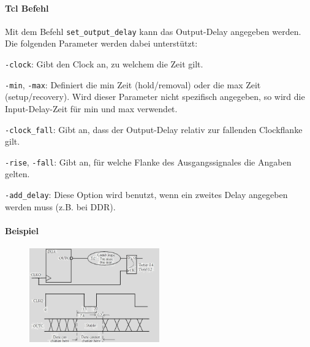 \paragraph{Tcl Befehl}
Mit dem Befehl \texttt{set\_output\_delay} kann das Output-Delay angegeben werden. Die folgenden Parameter werden dabei unterstützt:
\begin{compactitem}
    \item \texttt{-clock}: Gibt den Clock an, zu welchem die Zeit gilt.
    \item \texttt{-min}, \texttt{-max}: Definiert die min Zeit (hold/removal) oder die max Zeit (setup/recovery). Wird dieser Parameter nicht spezifisch angegeben, so wird die Input-Delay-Zeit für min und max verwendet.
    \item \texttt{-clock\_fall}: Gibt an, dass der Output-Delay relativ zur fallenden Clockflanke gilt.
    \item \texttt{-rise}, \texttt{-fall}: Gibt an, für welche Flanke des Ausgangssignales die Angaben gelten.
    \item \texttt{-add\_delay}: Diese Option wird benutzt, wenn ein zweites Delay angegeben werden muss (z.B. bei DDR).
\end{compactitem}

\paragraph{Beispiel}
\begin{figure}[H]
    \includegraphics[width=0.5\textwidth]{images/output_delay.png}
\end{figure}

